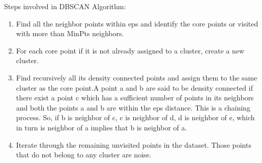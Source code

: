 Steps involved in DBSCAN Algorithm:
\begin{enumerate}
    \item Find all the neighbor points within eps and identify the core points or visited with more than MinPts neighbors.
    \item For each core point if it is not already assigned to a cluster, create a new cluster.
    \item Find recursively all its density connected points and assign them to the same cluster as the core point.A point a and b are said to be density connected if there exist a point c which has a sufficient number of points in its neighbors and both the points a and b are within the eps distance. This is a chaining process. So, if b is neighbor of c, c is neighbor of d, d is neighbor of e, which in turn is neighbor of a implies that b is neighbor of a.

    \item 
Iterate through the remaining unvisited points in the dataset. Those points that do not belong to any cluster are noise.
\end{enumerate}






 				
